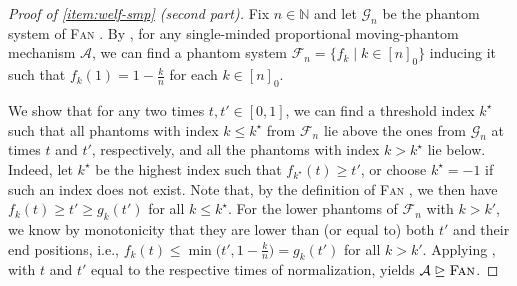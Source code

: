 \documentclass[11pt]{article}
\newcommand{\F}{\mathcal{F}}
\newcommand{\G}{\mathcal{G}}
\newcommand{\A}{\mathcal{A}}
\newcommand{\N}{\mathbb{N}}
\newcommand{\Fan}{\textsc{Fan} }
\begin{document}
\begin{proof}[Proof of  \textnormal{\ref{item:welf-smp}} (second part)]
    Fix $n\in \N$ and let $\G_n$ be the phantom system of \Fan. By , for any single-minded proportional moving-phantom mechanism $\A$, we can find a phantom system $\F_n=\{f_k\mid k\in [n]_0\}$ inducing it such that $f_k(1) = 1 - \frac{k}{n}$ for each $k\in [n]_0$.

    We show that for any two times $t, t' \in [0,1]$, we can find a threshold index $k^\star$ such that all phantoms with index $k \le k^\star$ from $\F_n$ lie above the ones from $\G_n$ at times $t$ and $t'$, respectively, and all the phantoms with index $k > k^\star$ lie below. 
    Indeed, let $k^\star$ be the highest index such that $f_{k^\star}(t) \ge t'$, or choose $k^\star = -1$ if such an index does not exist. Note that, by the definition of \Fan, we then have $f_{k}(t) \ge t' \ge g_{k}(t')$ for all $k \leq k^\star$. For the lower phantoms of $\F_n$ with $k > k'$, we know by monotonicity that they are lower than (or equal to) both $t'$ and their end positions, i.e., $f_{k}(t) \le \min\big(t', 1 - \frac{k}{n}\big) = g_{k}(t')$ for all $k > k'$. Applying , with $t$ and $t'$ equal to the respective times of normalization, yields $\A \trianglerighteq \Fan$.
\end{proof}
\end{document}
